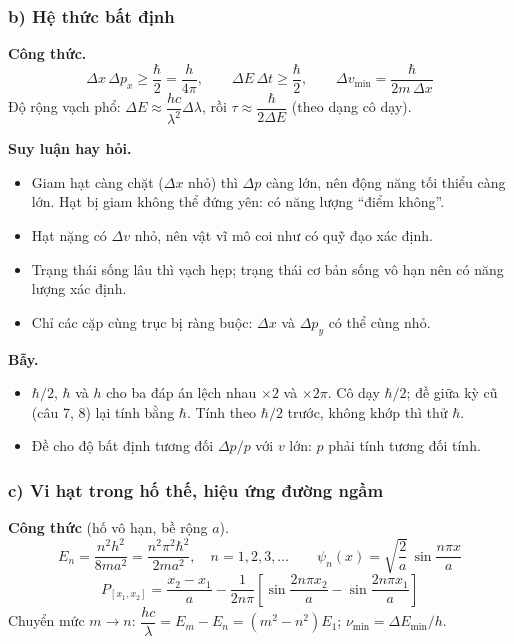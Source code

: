 \documentclass[11pt,a4paper]{article}
\begin{document}
\subsubsection*{b) Hệ thức bất định}

\textbf{Công thức.}
\begin{equation*}
    \Delta x\,\Delta p_x\ge\frac\hbar2=\frac h{4\pi},\qquad \Delta E\,\Delta t\ge\frac\hbar2,\qquad \Delta v_{\min}=\frac{\hbar}{2m\,\Delta x}
\end{equation*}
Độ rộng vạch phổ: $\Delta E\approx\dfrac{hc}{\lambda^2}\Delta\lambda$, rồi $\tau\approx\dfrac{\hbar}{2\Delta E}$ (theo dạng cô dạy).

\textbf{Suy luận hay hỏi.}
\begin{itemize}
    \item Giam hạt càng chặt ($\Delta x$ nhỏ) thì $\Delta p$ càng lớn, nên động năng tối thiểu càng lớn. Hạt bị giam không thể đứng yên: có năng lượng ``điểm không''.
    \item Hạt nặng có $\Delta v$ nhỏ, nên vật vĩ mô coi như có quỹ đạo xác định.
    \item Trạng thái sống lâu thì vạch hẹp; trạng thái cơ bản sống vô hạn nên có năng lượng xác định.
    \item Chỉ các cặp cùng trục bị ràng buộc: $\Delta x$ và $\Delta p_y$ có thể cùng nhỏ.
\end{itemize}

\textbf{Bẫy.}
\begin{itemize}
    \item $\hbar/2$, $\hbar$ và $h$ cho ba đáp án lệch nhau $\times2$ và $\times2\pi$. Cô dạy $\hbar/2$; đề giữa kỳ cũ (câu 7, 8) lại tính bằng $\hbar$. Tính theo $\hbar/2$ trước, không khớp thì thử $\hbar$.
    \item Đề cho độ bất định tương đối $\Delta p/p$ với $v$ lớn: $p$ phải tính tương đối tính.
\end{itemize}

\subsubsection*{c) Vi hạt trong hố thế, hiệu ứng đường ngầm}

\textbf{Công thức} (hố vô hạn, bề rộng $a$).
\begin{equation*}
    E_n=\frac{n^2h^2}{8ma^2}=\frac{n^2\pi^2\hbar^2}{2ma^2},\quad n=1,2,3,\dots\qquad \psi_n(x)=\sqrt{\frac2a}\,\sin\frac{n\pi x}{a}
\end{equation*}
\begin{equation*}
    P_{[x_1,x_2]}=\frac{x_2-x_1}{a}-\frac{1}{2n\pi}\left[\sin\frac{2n\pi x_2}{a}-\sin\frac{2n\pi x_1}{a}\right]
\end{equation*}
Chuyển mức $m\to n$: $\dfrac{hc}{\lambda}=E_m-E_n=(m^2-n^2)E_1$; $\nu_{\min}=\Delta E_{\min}/h$.
\end{document}
